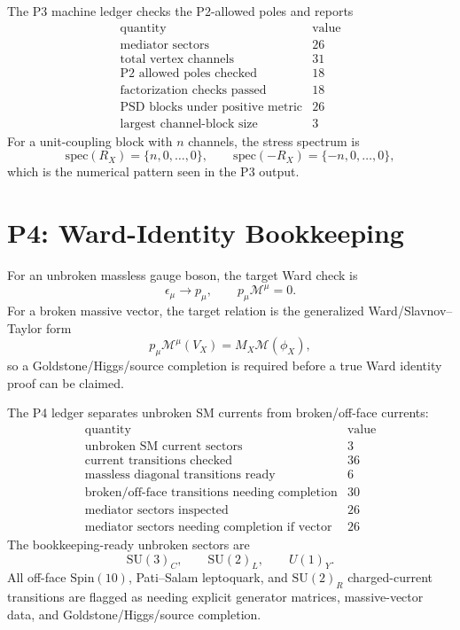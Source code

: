 \documentclass[11pt]{article}
\newcommand{\SU}{\mathrm{SU}}
\newcommand{\Spin}{\mathrm{Spin}}
\begin{document}
The P3 machine ledger checks the P2-allowed poles and reports
\begin{equation}
\begin{array}{c|c}
\text{quantity} & \text{value} \\
\hline
\text{mediator sectors} & 26\\
\text{total vertex channels} & 31\\
\text{P2 allowed poles checked} & 18\\
\text{factorization checks passed} & 18\\
\text{PSD blocks under positive metric} & 26\\
\text{largest channel-block size} & 3
\end{array}
\end{equation}
For a unit-coupling block with $n$ channels, the stress spectrum is
\begin{equation}
  \mathrm{spec}(R_X)=\{n,0,\ldots,0\},
  \qquad
  \mathrm{spec}(-R_X)=\{-n,0,\ldots,0\},
\end{equation}
which is the numerical pattern seen in the P3 output.

\section{P4: Ward-Identity Bookkeeping}

For an unbroken massless gauge boson, the target Ward check is
\begin{equation}
  \epsilon_\mu\rightarrow p_\mu,\qquad p_\mu\mathcal M^\mu=0.
\end{equation}
For a broken massive vector, the target relation is the generalized
Ward/Slavnov--Taylor form
\begin{equation}
  p_\mu\mathcal M^\mu(V_X)=M_X\mathcal M(\phi_X),
\end{equation}
so a Goldstone/Higgs/source completion is required before a true Ward
identity proof can be claimed.

The P4 ledger separates unbroken SM currents from broken/off-face
currents:
\begin{equation}
\begin{array}{c|c}
\text{quantity} & \text{value} \\
\hline
\text{unbroken SM current sectors} & 3\\
\text{current transitions checked} & 36\\
\text{massless diagonal transitions ready} & 6\\
\text{broken/off-face transitions needing completion} & 30\\
\text{mediator sectors inspected} & 26\\
\text{mediator sectors needing completion if vector} & 26
\end{array}
\end{equation}
The bookkeeping-ready unbroken sectors are
\begin{equation}
  \SU(3)_C,\qquad \SU(2)_L,\qquad U(1)_Y.
\end{equation}
All off-face $\Spin(10)$, Pati--Salam leptoquark, and $\SU(2)_R$
charged-current transitions are flagged as needing explicit generator
matrices, massive-vector data, and Goldstone/Higgs/source completion.
\end{document}
